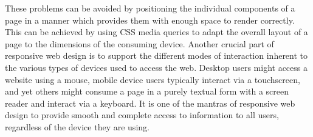 These problems can be avoided by positioning the individual components
of a page in a manner which provides them with enough space to render
correctly. This can be achieved by using CSS media queries to adapt
the overall layout of a page to the dimensions of the consuming
device. Another crucial part of responsive web design is to support
the different modes of interaction inherent to the various types of
devices used to access the web. Desktop users might access a website
using a mouse, mobile device users typically interact via a
touchscreen, and yet others might consume a page in a purely textual
form with a screen reader and interact via a keyboard. It is one of
the mantras of responsive web design to provide smooth and complete
access to information to all users, regardless of the device they are
using.